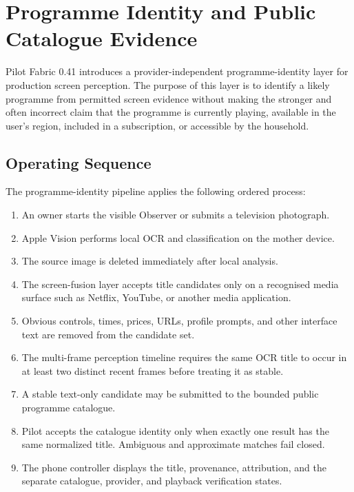 
\section{Programme Identity and Public Catalogue Evidence}
\label{sec:programme-identity-catalogue}

Pilot Fabric 0.41 introduces a provider-independent programme-identity layer for
production screen perception. The purpose of this layer is to identify a likely
programme from permitted screen evidence without making the stronger and often
incorrect claim that the programme is currently playing, available in the user's
region, included in a subscription, or accessible by the household.

\subsection{Operating Sequence}

The programme-identity pipeline applies the following ordered process:

\begin{enumerate}
  \item An owner starts the visible Observer or submits a television photograph.
  \item Apple Vision performs local OCR and classification on the mother device.
  \item The source image is deleted immediately after local analysis.
  \item The screen-fusion layer accepts title candidates only on a recognised
        media surface such as Netflix, YouTube, or another media application.
  \item Obvious controls, times, prices, URLs, profile prompts, and other interface
        text are removed from the candidate set.
  \item The multi-frame perception timeline requires the same OCR title to occur
        in at least two distinct recent frames before treating it as stable.
  \item A stable text-only candidate may be submitted to the bounded public
        programme catalogue.
  \item Pilot accepts the catalogue identity only when exactly one result has the
        same normalized title. Ambiguous and approximate matches fail closed.
  \item The phone controller displays the title, provenance, attribution, and the
        separate catalogue, provider, and playback verification states.
\end{enumerate}

